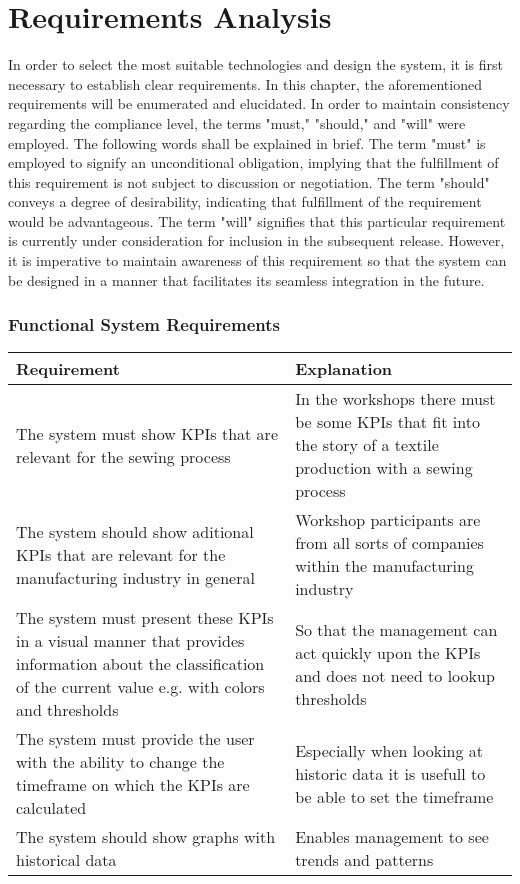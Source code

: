 \chapter{\textbf{Requirements Analysis}}\label{grundlagen}
In order to select the most suitable technologies and design the system, it is first necessary to establish clear requirements. In this chapter, the aforementioned requirements will be enumerated and elucidated.
In order to maintain consistency regarding the compliance level, the terms "must," "should," and "will" were employed.
The following words shall be explained in brief. The term "must" is employed to signify an unconditional obligation, implying that the fulfillment of this requirement is not subject to discussion or negotiation. The term "should" conveys a degree of desirability, indicating that fulfillment of the requirement would be advantageous. The term "will" signifies that this particular requirement is currently under consideration for inclusion in the subsequent release. However, it is imperative to maintain awareness of this requirement so that the system can be designed in a manner that facilitates its seamless integration in the future.
\subsection{Functional System Requirements} %
\begin{tabularx}{\textwidth}{|X|X|}
	\hline
\textbf{Requirement}	& \textbf{Explanation} \\
	\hline
The system must show KPIs that are relevant for the sewing process	&  In the workshops there must be some KPIs that fit into the story of a textile production with a sewing process\\
	\hline
The system should show aditional KPIs that are relevant for the manufacturing industry in general	&  Workshop participants are from all sorts of companies within the manufacturing industry\\
	\hline
 The system must present these KPIs in a visual manner that provides information about the classification of the current value e.g. with colors and thresholds	& So that the management can act quickly upon the KPIs and does not need to lookup thresholds \\
	\hline
The system must provide the user with the ability to change the timeframe on which the KPIs are calculated	&  Especially when looking at historic data it is usefull to be able to set the timeframe\\
	\hline
The system should show graphs with historical data & Enables management to see trends and patterns\\
	\hline
\end{tabularx}


